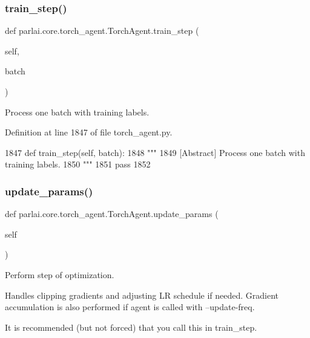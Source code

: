 \subsubsection{\texorpdfstring{train\+\_\+step()}{train\_step()}}
{\footnotesize\ttfamily def parlai.\+core.\+torch\+\_\+agent.\+Torch\+Agent.\+train\+\_\+step (\begin{DoxyParamCaption}\item[{}]{self,  }\item[{}]{batch }\end{DoxyParamCaption})}

\begin{DoxyVerb}[Abstract] Process one batch with training labels.
\end{DoxyVerb}
 

Definition at line 1847 of file torch\+\_\+agent.\+py.


\begin{DoxyCode}
1847     \textcolor{keyword}{def }train\_step(self, batch):
1848         \textcolor{stringliteral}{"""}
1849 \textcolor{stringliteral}{        [Abstract] Process one batch with training labels.}
1850 \textcolor{stringliteral}{        """}
1851         \textcolor{keywordflow}{pass}
1852 
\end{DoxyCode}
\mbox{\label{classparlai_1_1core_1_1torch__agent_1_1TorchAgent_a7e2c9e180887397daa6229a0f9700b1c}} 
\subsubsection{\texorpdfstring{update\+\_\+params()}{update\_params()}}
{\footnotesize\ttfamily def parlai.\+core.\+torch\+\_\+agent.\+Torch\+Agent.\+update\+\_\+params (\begin{DoxyParamCaption}\item[{}]{self }\end{DoxyParamCaption})}

\begin{DoxyVerb}Perform step of optimization.

Handles clipping gradients and adjusting LR schedule if needed.
Gradient accumulation is also performed if agent is called with
--update-freq.

It is recommended (but not forced) that you call this in train_step.
\end{DoxyVerb}
 

